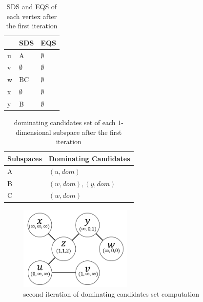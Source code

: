 \begin{table}[h]
    \centering
    \begin{tabular}{|l|l|l|}
    \hline
      & SDS         & EQS         \\ \hline
    u & A           & $\emptyset$ \\ \hline
    v & $\emptyset$ & $\emptyset$ \\ \hline
    w & BC          & $\emptyset$ \\ \hline
    x & $\emptyset$ & $\emptyset$ \\ \hline
    y & B           & $\emptyset$ \\ \hline
    \end{tabular}
    \caption{\label{font-table}SDS and EQS of each vertex after the first iteration}
\end{table}

\begin{table}[h]
    \centering

    \begin{tabular}{|l|l|}
    \hline
    Subspaces & Dominating Candidates \\ \hline
    A         & $(u, dom)$            \\ \hline
    B         & $(w, dom), (y, dom)$            \\ \hline
    C         & $(w, dom)$            \\ \hline
    \end{tabular}
    \caption{\label{font-table}dominating candidates set of each $1$-dimensional subspace after the first iteration}
\end{table}

\begin{figure}[h]
    \centering
    \includegraphics[width=0.5\textwidth]{figs/graph_example_2}
    \caption{\label{font-figure}second iteration of dominating candidates set computation}
    \label{fig:cand_step2}
\end{figure}

